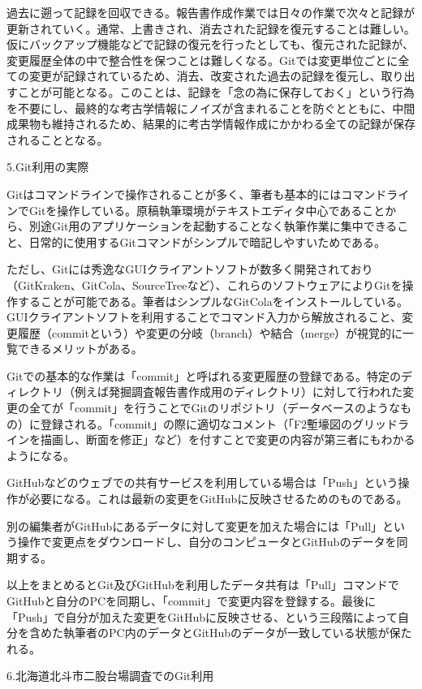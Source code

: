 \documentclass[9pt,b5j,papersize]{jsarticle}
\begin{document}
\begin{multicols}{2}
過去に遡って記録を回収できる。報告書作成作業では日々の作業で次々と記録が更新されていく。通常、上書きされ、消去された記録を復元することは難しい。仮にバックアップ機能などで記録の復元を行ったとしても、復元された記録が、変更履歴全体の中で整合性を保つことは難しくなる。Gitでは変更単位ごとに全ての変更が記録されているため、消去、改変された過去の記録を復元し、取り出すことが可能となる。このことは、記録を「念の為に保存しておく」という行為を不要にし、最終的な考古学情報にノイズが含まれることを防ぐとともに、中間成果物も維持されるため、結果的に考古学情報作成にかかわる全ての記録が保存されることとなる。

\noindent
{\large 5.Git利用の実際}

Gitはコマンドラインで操作されることが多く、筆者も基本的にはコマンドラインでGitを操作している。原稿執筆環境がテキストエディタ中心であることから、別途Git用のアプリケーションを起動することなく執筆作業に集中できること、日常的に使用するGitコマンドがシンプルで暗記しやすいためである。

ただし、Gitには秀逸なGUIクライアントソフトが数多く開発されており（GitKraken、GitCola、SourceTreeなど）、これらのソフトウェアによりGitを操作することが可能である。筆者はシンプルなGitColaをインストールしている。GUIクライアントソフトを利用することでコマンド入力から解放されること、変更履歴（commitという）や変更の分岐（branch）や結合（merge）が視覚的に一覧できるメリットがある。

Gitでの基本的な作業は「commit」と呼ばれる変更履歴の登録である。特定のディレクトリ（例えば発掘調査報告書作成用のディレクトリ）に対して行われた変更の全てが「commit」を行うことでGitのリポジトリ（データベースのようなもの）に登録される。「commit」の際に適切なコメント（「F2塹壕図のグリッドラインを描画し、断面を修正」など）を付すことで変更の内容が第三者にもわかるようになる。

GitHubなどのウェブでの共有サービスを利用している場合は「Push」という操作が必要になる。これは最新の変更をGitHubに反映させるためのものである。

別の編集者がGitHubにあるデータに対して変更を加えた場合には「Pull」という操作で変更点をダウンロードし、自分のコンピュータとGitHubのデータを同期する。

以上をまとめるとGit及びGitHubを利用したデータ共有は「Pull」コマンドでGitHubと自分のPCを同期し、「commit」で変更内容を登録する。最後に「Push」で自分が加えた変更をGitHubに反映させる、という三段階によって自分を含めた執筆者のPC内のデータとGitHubのデータが一致している状態が保たれる。


\noindent
{\large 6.北海道北斗市二股台場調査でのGit利用}


\end{multicols}
\end{document}

